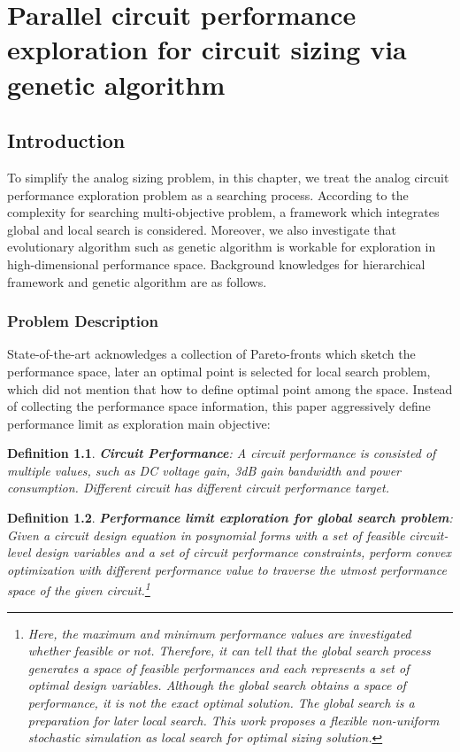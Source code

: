 
\chapter{Parallel circuit performance exploration for circuit sizing via genetic algorithm}\label{chap:PAGE}
  \section{Introduction}\label{sec:PAGEIntro}
    To simplify the analog sizing problem, in this chapter, we treat the analog circuit performance exploration problem as a searching process. According to the complexity for searching multi-objective problem, a framework which integrates global and local search is considered. Moreover, we also investigate that evolutionary algorithm such as genetic algorithm is workable for exploration in high-dimensional performance space. Background knowledges for hierarchical framework and genetic algorithm are as follows.
    \subsection{Problem Description} 
      State-of-the-art acknowledges a collection of Pareto-fronts which sketch the performance space, later an optimal point is selected for local search problem, which did not mention that how to define optimal point among the space. Instead of collecting the performance space information, this paper aggressively define performance limit as exploration main objective:

      \newtheorem{defi}{Definition}
      
      \begin{defi}
        {\bf Circuit Performance}: A circuit performance is consisted of multiple values, such as DC voltage gain, 3dB gain bandwidth and power consumption. Different circuit has different circuit performance target.
      \end{defi}

      \begin{defi}
        {\bf Performance limit exploration for global search problem}: Given a circuit design equation in posynomial forms with a set of feasible circuit-level design variables and a set of circuit performance constraints, perform convex optimization with different performance value to traverse the utmost performance space of the given circuit.\footnote{Here, the maximum and minimum performance values are investigated whether feasible or not. Therefore, it can tell that the global search process generates a space of feasible performances and each represents a set of optimal design variables. Although the global search obtains a space of performance, it is not the exact optimal solution. The global search is a preparation for later local search. This work proposes a flexible non-uniform stochastic simulation as local search for optimal sizing solution. }
      \end{defi}


